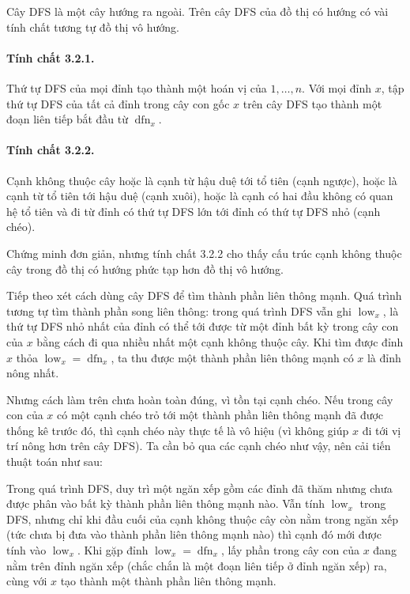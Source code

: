 \documentclass[11pt]{article}
\begin{document}
Cây DFS là một cây hướng ra ngoài. Trên cây DFS của đồ thị có hướng có vài tính
chất tương tự đồ thị vô hướng.

\paragraph{Tính chất 3.2.1.}
Thứ tự DFS của mọi đỉnh tạo thành một hoán vị của $1,\ldots,n$. Với mọi đỉnh
$x$, tập thứ tự DFS của tất cả đỉnh trong cây con gốc $x$ trên cây DFS tạo thành
một đoạn liên tiếp bắt đầu từ $\operatorname{dfn}_x$.

\paragraph{Tính chất 3.2.2.}
Cạnh không thuộc cây hoặc là cạnh từ hậu duệ tới tổ tiên (cạnh ngược), hoặc là
cạnh từ tổ tiên tới hậu duệ (cạnh xuôi), hoặc là cạnh có hai đầu không có quan
hệ tổ tiên và đi từ đỉnh có thứ tự DFS lớn tới đỉnh có thứ tự DFS nhỏ (cạnh
chéo).

Chứng minh đơn giản, nhưng tính chất 3.2.2 cho thấy cấu trúc cạnh không thuộc
cây trong đồ thị có hướng phức tạp hơn đồ thị vô hướng.

Tiếp theo xét cách dùng cây DFS để tìm thành phần liên thông mạnh. Quá trình
tương tự tìm thành phần song liên thông: trong quá trình DFS vẫn ghi
$\operatorname{low}_x$, là thứ tự DFS nhỏ nhất của đỉnh có thể tới được từ một
đỉnh bất kỳ trong cây con của $x$ bằng cách đi qua nhiều nhất một cạnh không
thuộc cây. Khi tìm được đỉnh $x$ thỏa
$\operatorname{low}_x=\operatorname{dfn}_x$, ta thu được một thành phần liên
thông mạnh có $x$ là đỉnh nông nhất.

Nhưng cách làm trên chưa hoàn toàn đúng, vì tồn tại cạnh chéo. Nếu trong cây con
của $x$ có một cạnh chéo trỏ tới một thành phần liên thông mạnh đã được thống kê
trước đó, thì cạnh chéo này thực tế là vô hiệu (vì không giúp $x$ đi tới vị trí
nông hơn trên cây DFS). Ta cần bỏ qua các cạnh chéo như vậy, nên cải tiến thuật
toán như sau:

Trong quá trình DFS, duy trì một ngăn xếp gồm các đỉnh đã thăm nhưng chưa được
phân vào bất kỳ thành phần liên thông mạnh nào. Vẫn tính $\operatorname{low}_x$
trong DFS, nhưng chỉ khi đầu cuối của cạnh không thuộc cây còn nằm trong ngăn
xếp (tức chưa bị đưa vào thành phần liên thông mạnh nào) thì cạnh đó mới được
tính vào $\operatorname{low}_x$. Khi gặp đỉnh
$\operatorname{low}_x=\operatorname{dfn}_x$, lấy phần trong cây con của $x$ đang
nằm trên đỉnh ngăn xếp (chắc chắn là một đoạn liên tiếp ở đỉnh ngăn xếp) ra,
cùng với $x$ tạo thành một thành phần liên thông mạnh.
\end{document}
